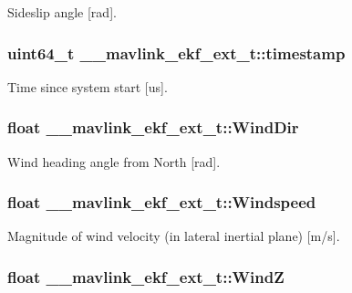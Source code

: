 Sideslip angle \mbox{[}rad\mbox{]}. 

\hypertarget{struct____mavlink__ekf__ext__t_ac4bda684e5f48ce4a55fea862458d42c}{
\subsubsection[{timestamp}]{\setlength{\rightskip}{0pt plus 5cm}uint64\+\_\+t \+\_\+\+\_\+mavlink\+\_\+ekf\+\_\+ext\+\_\+t\+::timestamp}}\label{struct____mavlink__ekf__ext__t_ac4bda684e5f48ce4a55fea862458d42c}


Time since system start \mbox{[}us\mbox{]}. 

\hypertarget{struct____mavlink__ekf__ext__t_a9a26ed5ad677ce0a1925377aeb72531d}{
\subsubsection[{Wind\+Dir}]{\setlength{\rightskip}{0pt plus 5cm}float \+\_\+\+\_\+mavlink\+\_\+ekf\+\_\+ext\+\_\+t\+::\+Wind\+Dir}}\label{struct____mavlink__ekf__ext__t_a9a26ed5ad677ce0a1925377aeb72531d}


Wind heading angle from North \mbox{[}rad\mbox{]}. 

\hypertarget{struct____mavlink__ekf__ext__t_a698a2df2f98b82adcb22f8796c7f1d86}{
\subsubsection[{Windspeed}]{\setlength{\rightskip}{0pt plus 5cm}float \+\_\+\+\_\+mavlink\+\_\+ekf\+\_\+ext\+\_\+t\+::\+Windspeed}}\label{struct____mavlink__ekf__ext__t_a698a2df2f98b82adcb22f8796c7f1d86}


Magnitude of wind velocity (in lateral inertial plane) \mbox{[}m/s\mbox{]}. 

\hypertarget{struct____mavlink__ekf__ext__t_ae44d394d314976288efa59cf2a5622bd}{
\subsubsection[{Wind\+Z}]{\setlength{\rightskip}{0pt plus 5cm}float \+\_\+\+\_\+mavlink\+\_\+ekf\+\_\+ext\+\_\+t\+::\+Wind\+Z}}\label{struct____mavlink__ekf__ext__t_ae44d394d314976288efa59cf2a5622bd}


